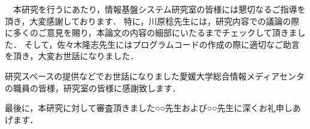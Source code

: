 \documentclass{thesis}
\begin{document}


\tableofcontents











\acknowledgement

　本研究を行うにあたり，情報基盤システム研究室の皆様には懇切なるご指導を頂き，大変感謝しております．
特に，川原稔先生には，研究内容での議論の際に多くのご意見を賜り，本論文の内容の細部にいたるまでチェックして頂きました．
そして，佐々木隆志先生にはプログラムコードの作成の際に適切なご助言を頂き，大変お世話になりました．

研究スペースの提供などでお世話になりました愛媛大学総合情報メディアセンタの職員の皆様，研究室の皆様に感謝致します．

最後に，本研究に対して審査頂きました○○先生および○○先生に深くお礼申しあげます．


\begin{comment}


\nocite{*}
\end{comment}
\end{document}

